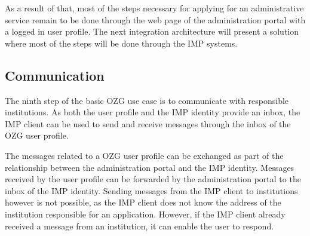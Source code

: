 As a result of that, most of the steps necessary for applying for an administrative service remain to be done through the web page of the administration portal with a logged in user profile. The next integration architecture will present a solution where most of the steps will be done through the IMP systems.

\subsection{Communication}

The ninth step of the basic OZG use case is to communicate with responsible institutions. As both the user profile and the IMP identity provide an inbox, the IMP client can be used to send and receive messages through the inbox of the OZG user profile.

The messages related to a OZG user profile can be exchanged as part of the relationship between the administration portal and the IMP identity. Messages received by the user profile can be forwarded by the administration portal to the inbox of the IMP identity. Sending messages from the IMP client to institutions however is not possible, as the IMP client does not know the address of the institution responsible for an application. However, if the IMP client already received a message from an institution, it can enable the user to respond.
